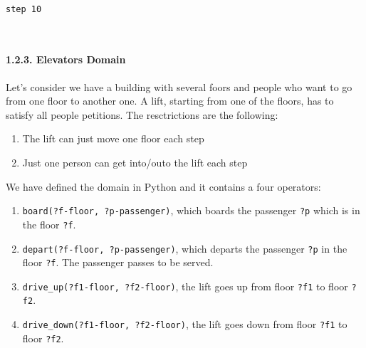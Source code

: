 \documentclass[11pt]{article}
\providecommand{\tightlist}{%
      \setlength{\itemsep}{0pt}\setlength{\parskip}{0pt}}
\begin{document}
    \begin{center}
    \end{center}
    { \hspace*{\fill} \\}
    
    \begin{Verbatim}[commandchars=\\\{\}]
step 10

    \end{Verbatim}

    \begin{center}
    \end{center}
    { \hspace*{\fill} \\}
    
    \paragraph{1.2.3. Elevators Domain}\label{elevators-domain}

Let's consider we have a building with several foors and people who want
to go from one floor to another one. A lift, starting from one of the
floors, has to satisfy all people petitions. The resctrictions are the
following:

\begin{enumerate}
\def\labelenumi{\arabic{enumi}.}
\tightlist
\item
  The lift can just move one floor each step
\item
  Just one person can get into/outo the lift each step
\end{enumerate}

We have defined the domain in Python and it contains a four operators:

\begin{enumerate}
\def\labelenumi{\arabic{enumi}.}
\tightlist
\item
  \texttt{board(?f-floor,\ ?p-passenger)}, which boards the passenger
  \texttt{?p} which is in the floor \texttt{?f}.
\item
  \texttt{depart(?f-floor,\ ?p-passenger)}, which departs the passenger
  \texttt{?p} in the floor \texttt{?f}. The passenger passes to be
  served.
\item
  \texttt{drive\_up(?f1-floor,\ ?f2-floor)}, the lift goes up from floor
  \texttt{?f1} to floor \texttt{?f2}.
\item
  \texttt{drive\_down(?f1-floor,\ ?f2-floor)}, the lift goes down from
  floor \texttt{?f1} to floor \texttt{?f2}.
\end{enumerate}
\end{document}
